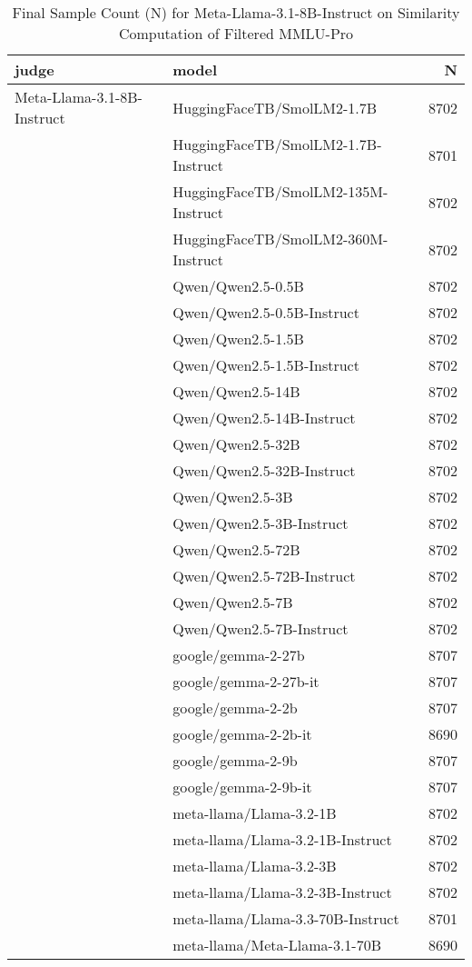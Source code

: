 \begin{table}[]
    \centering
     \caption{Final Sample Count (N) for Meta-Llama-3.1-8B-Instruct on Similarity Computation of Filtered MMLU-Pro}
\begin{tabular}{llr}
\toprule
judge & model & N \\
\midrule
Meta-Llama-3.1-8B-Instruct & HuggingFaceTB/SmolLM2-1.7B & 8702 \\
 & HuggingFaceTB/SmolLM2-1.7B-Instruct & 8701 \\
 & HuggingFaceTB/SmolLM2-135M-Instruct & 8702 \\
 & HuggingFaceTB/SmolLM2-360M-Instruct & 8702 \\
 & Qwen/Qwen2.5-0.5B & 8702 \\
 & Qwen/Qwen2.5-0.5B-Instruct & 8702 \\
 & Qwen/Qwen2.5-1.5B & 8702 \\
 & Qwen/Qwen2.5-1.5B-Instruct & 8702 \\
 & Qwen/Qwen2.5-14B & 8702 \\
 & Qwen/Qwen2.5-14B-Instruct & 8702 \\
 & Qwen/Qwen2.5-32B & 8702 \\
 & Qwen/Qwen2.5-32B-Instruct & 8702 \\
 & Qwen/Qwen2.5-3B & 8702 \\
 & Qwen/Qwen2.5-3B-Instruct & 8702 \\
 & Qwen/Qwen2.5-72B & 8702 \\
 & Qwen/Qwen2.5-72B-Instruct & 8702 \\
 & Qwen/Qwen2.5-7B & 8702 \\
 & Qwen/Qwen2.5-7B-Instruct & 8702 \\
 & google/gemma-2-27b & 8707 \\
 & google/gemma-2-27b-it & 8707 \\
 & google/gemma-2-2b & 8707 \\
 & google/gemma-2-2b-it & 8690 \\
 & google/gemma-2-9b & 8707 \\
 & google/gemma-2-9b-it & 8707 \\
 & meta-llama/Llama-3.2-1B & 8702 \\
 & meta-llama/Llama-3.2-1B-Instruct & 8702 \\
 & meta-llama/Llama-3.2-3B & 8702 \\
 & meta-llama/Llama-3.2-3B-Instruct & 8702 \\
 & meta-llama/Llama-3.3-70B-Instruct & 8701 \\
 & meta-llama/Meta-Llama-3.1-70B & 8690 \\

\end{tabular}
\end{table}
